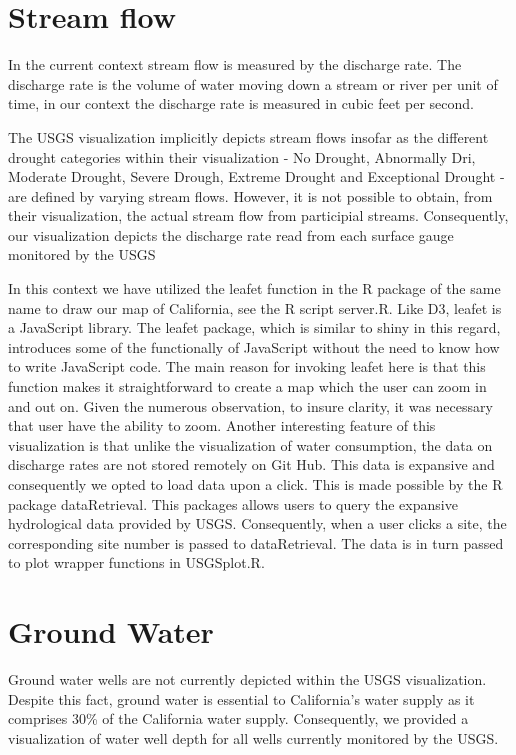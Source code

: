 \documentclass[english]{article}\usepackage[]{graphicx}\usepackage[]{color}
\begin{document}
\section{Stream flow}

In the current context stream flow is measured by the discharge rate.
The discharge rate is the volume of water moving down a stream or
river per unit of time, in our context the discharge rate is measured
in cubic feet per second.

The USGS visualization implicitly depicts stream flows insofar as
the different drought categories within their visualization - No Drought,
Abnormally Dri, Moderate Drought, Severe Drough, Extreme Drought and
Exceptional Drought - are defined by varying stream flows. However,
it is not possible to obtain, from their visualization, the actual
stream flow from participial streams. Consequently, our visualization
depicts the discharge rate read from each surface gauge monitored
by the USGS

In this context we have utilized the leafet function in the R package
of the same name to draw our map of California, see the R script server.R.
Like D3, leafet is a JavaScript library. The leafet package, which
is similar to shiny in this regard, introduces some of the functionally
of JavaScript without the need to know how to write JavaScript code.
The main reason for invoking leafet here is that this function makes
it straightforward to create a map which the user can zoom in and
out on. Given the numerous observation, to insure clarity, it was
necessary that user have the ability to zoom. Another interesting
feature of this visualization is that unlike the visualization of
water consumption, the data on discharge rates are not stored remotely
on Git Hub. This data is expansive and consequently we opted to load
data upon a click. This is made possible by the R package dataRetrieval.
This packages allows users to query the expansive hydrological data
provided by USGS. Consequently, when a user clicks a site, the corresponding
site number is passed to dataRetrieval. The data is in turn passed
to plot wrapper functions in USGSplot.R.


\section{Ground Water}

Ground water wells are not currently depicted within the USGS visualization.
Despite this fact, ground water is essential to California's water
supply as it comprises 30\% of the California water supply. Consequently,
we provided a visualization of water well depth for all wells currently
monitored by the USGS.
\end{document}
